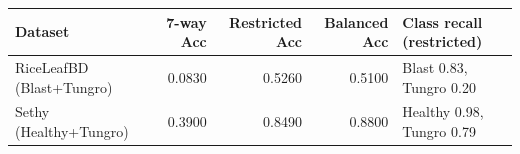 \begin{tabular}{lrrrl}
\toprule
Dataset & 7-way Acc & Restricted Acc & Balanced Acc & Class recall (restricted) \\
\midrule
RiceLeafBD (Blast+Tungro) & 0.0830 & 0.5260 & 0.5100 & Blast 0.83, Tungro 0.20 \\
Sethy (Healthy+Tungro) & 0.3900 & 0.8490 & 0.8800 & Healthy 0.98, Tungro 0.79 \\
\bottomrule
\end{tabular}
